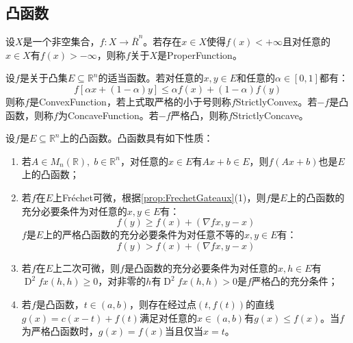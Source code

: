 \subsection{凸函数}
\begin{definition}
	设$X$是一个非空集合，$f:X\to\overline{R}^n$。若存在$x\in X$使得$f(x)<+\infty$且对任意的$x\in X$有$f(x)>-\infty$，则称$f$关于$X$是\gls{ProperFunction}。
\end{definition}
\begin{definition}
	设$f$是关于凸集$E\subseteq\mathbb{R}^{n}$的适当函数。若对任意的$x,y\in E$和任意的$\alpha\in[0,1]$都有：
	\begin{equation*}
		f[\alpha x+(1-\alpha)y]\leqslant\alpha f(x)+(1-\alpha)f(y)
	\end{equation*}
	则称$f$是\gls{ConvexFunction}，若上式取严格的小于号则称$f$\gls{StrictlyConvex}。若$-f$是凸函数，则称$f$为\gls{ConcaveFunction}。若$-f$严格凸，则称$f$\gls{StrictlyConcave}。
\end{definition}
\begin{property}\label{prop:ConvexFunction}
	设$f$是$E\subseteq\mathbb{R}^{n}$上的凸函数。凸函数具有如下性质：
	\begin{enumerate}
		\item 若$A\in M_{n}(\mathbb{R}),\;b\in\mathbb{R}^{n}$，对任意的$x\in E$有$Ax+b\in E$，则$f(Ax+b)$也是$E$上的凸函数；
		\item 若$f$在$E$上Fr\'echet可微，根据\cref{prop:FrechetGateaux}(1)，则$f$是$E$上的凸函数的充分必要条件为对任意的$x,y\in E$有：
		\begin{equation*}
			f(y)\geqslant f(x)+(\nabla fx,y-x)
		\end{equation*}		
		$f$是$E$上的严格凸函数的充分必要条件为对任意不等的$x,y\in E$有：
		\begin{equation*}
			f(y)>f(x)+(\nabla fx,y-x)
		\end{equation*}		
		\item 若$f$在$E$上二次可微，则$f$是凸函数的充分必要条件为对任意的$x,h\in E$有$\operatorname{D}^2fx(h,h)\geqslant0$，对非零的$h$有$\operatorname{D}^2fx(h,h)>0$是$f$严格凸的充分条件；
		\item 若$f$是凸函数，$t\in(a,b)$，则存在经过点$(t,f(t))$的直线$g(x)=c(x-t)+f(t)$满足对任意的$x\in(a,b)$有$g(x)\leqslant f(x)$。当$f$为严格凸函数时，$g(x)=f(x)$当且仅当$x=t$。
	\end{enumerate}
\end{property}
